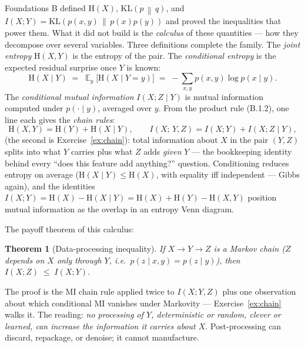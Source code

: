 \documentclass[11pt]{article}
\numberwithin{equation}{section}
\theoremstyle{plain}
\newtheorem{theorem}{Theorem}[section]
\theoremstyle{definition}
\theoremstyle{remark}
\DeclareMathOperator{\E}{\mathbb{E}}
\newcommand{\KL}[2]{\mathrm{KL}\!\left(#1 \,\middle\|\, #2\right)}
\newcommand{\Hent}{\mathrm{H}}
\begin{document}
Foundations B defined $\Hent(X)$, $\KL{p}{q}$, and $I(X;Y) = \KL{p(x,y)}{p(x)p(y)}$ and proved the inequalities that power them. What it did not build is the \emph{calculus} of these quantities --- how they decompose over several variables. Three definitions complete the family. The \emph{joint entropy} $\Hent(X, Y)$ is the entropy of the pair. The \emph{conditional entropy} is the expected residual surprise once $Y$ is known:
\begin{equation}
\Hent(X \mid Y) \;=\; \E_{y}\big[ \Hent(X \mid Y = y) \big]
\;=\; -\sum_{x,y} p(x,y) \log p(x \mid y).
\label{eq:condent}
\end{equation}
The \emph{conditional mutual information} $I(X; Z \mid Y)$ is mutual information computed under $p(\cdot \mid y)$, averaged over $y$. From the product rule (B.1.2), one line each gives the \emph{chain rules}:
\begin{equation}
\Hent(X, Y) = \Hent(Y) + \Hent(X \mid Y),
\qquad
I(X;\, Y, Z) = I(X; Y) + I(X; Z \mid Y),
\label{eq:chainrules}
\end{equation}
(the second is Exercise~\ref{ex:chain}): total information about $X$ in the pair $(Y, Z)$ splits into what $Y$ carries plus what $Z$ adds \emph{given} $Y$ --- the bookkeeping identity behind every ``does this feature add anything?'' question. Conditioning reduces entropy on average ($\Hent(X \mid Y) \le \Hent(X)$, with equality iff independent --- Gibbs again), and the identities $I(X;Y) = \Hent(X) - \Hent(X \mid Y) = \Hent(X) + \Hent(Y) - \Hent(X,Y)$ position mutual information as the overlap in an entropy Venn diagram.

The payoff theorem of this calculus:

\begin{theorem}[Data-processing inequality]\label{thm:dpi}
If $X \to Y \to Z$ is a Markov chain ($Z$ depends on $X$ only through $Y$, i.e.\ $p(z \mid x, y) = p(z \mid y)$), then
$I(X; Z) \;\le\; I(X; Y)$.
\end{theorem}

The proof is the MI chain rule applied twice to $I(X; Y, Z)$ plus one observation about which conditional MI vanishes under Markovity --- Exercise~\ref{ex:chain} walks it. The reading: \emph{no processing of $Y$, deterministic or random, clever or learned, can increase the information it carries about $X$}. Post-processing can discard, repackage, or denoise; it cannot manufacture.
\end{document}
